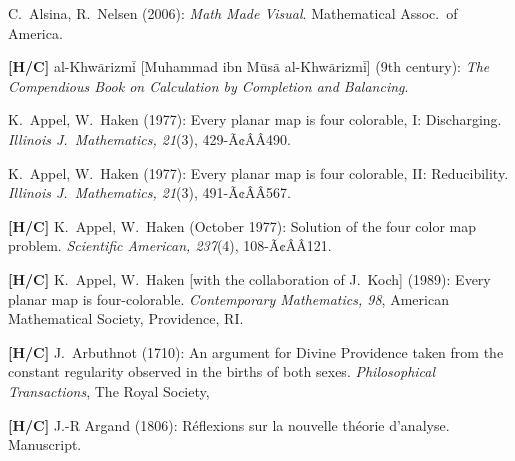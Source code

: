 
\begin{thebibliography}{999}
 


C.~Alsina, R.~Nelsen (2006): {\it Math Made Visual}.
Mathematical Assoc.~of America.

{\bf [H/C]}
al-Khw$\bar{\mbox{a}}$rizm$\bar{\mbox{i}}$ [Muhammad ibn M$\bar{\mbox{u}}$s$\bar{\mbox{a}}$ al-Khw$\bar{\mbox{a}}$rizm$\bar{\mbox{i}}$] (9th century):
{\it The Compendious Book on Calculation by Completion and Balancing}.



K.~Appel, W.~Haken (1977):
Every planar map is four colorable, I: Discharging.
{\it Illinois J.~Mathematics, 21}(3), 429-Ã¢ÂÂ490.

K.~Appel, W.~Haken (1977):
Every planar map is four colorable, II: Reducibility.
{\it Illinois J.~Mathematics, 21}(3), 491-Ã¢ÂÂ567.

{\bf [H/C]}
K.~Appel, W.~Haken (October 1977):
Solution of the four color map problem.
{\it Scientific American, 237}(4), 108-Ã¢ÂÂ121.

{\bf [H/C]}
K.~Appel, W.~Haken [with the collaboration of J.~Koch] (1989):
Every planar map is four-colorable.
{\it Contemporary Mathematics, 98},
American Mathematical Society, Providence, RI.

{\bf [H/C]}
J.~Arbuthnot (1710): 
An argument for Divine Providence taken from the constant regularity observed in the births of both sexes.
{\it Philosophical Transactions}, The Royal Society,

{\bf [H/C]}
J.-R Argand (1806):
R\'{e}flexions sur la nouvelle th\'{e}orie d'analyse.  Manuscript.



\end{thebibliography}
